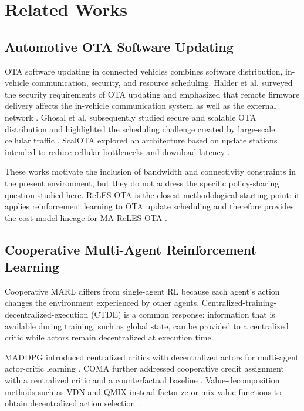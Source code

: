 \documentclass{iutbscthesis}
\begin{document}
\chapter{Related Works}

\section{Automotive OTA Software Updating}
OTA software updating in connected vehicles combines software distribution, in-vehicle communication, security, and resource scheduling. Halder et al. surveyed the security requirements of OTA updating and emphasized that remote firmware delivery affects the in-vehicle communication system as well as the external network \parencite{halder2020survey}. Ghosal et al. subsequently studied secure and scalable OTA distribution and highlighted the scheduling challenge created by large-scale cellular traffic \parencite{ghosal2022stride}. ScalOTA explored an architecture based on update stations intended to reduce cellular bottlenecks and download latency \parencite{shoker2023scalota}.

These works motivate the inclusion of bandwidth and connectivity constraints in the present environment, but they do not address the specific policy-sharing question studied here. ReLES-OTA is the closest methodological starting point: it applies reinforcement learning to OTA update scheduling and therefore provides the cost-model lineage for MA-ReLES-OTA \parencite{bhattacharjee2025relesota}.

\section{Cooperative Multi-Agent Reinforcement Learning}
Cooperative MARL differs from single-agent RL because each agent's action changes the environment experienced by other agents. Centralized-training-decentralized-execution (CTDE) is a common response: information that is available during training, such as global state, can be provided to a centralized critic while actors remain decentralized at execution time.

MADDPG introduced centralized critics with decentralized actors for multi-agent actor-critic learning \parencite{lowe2017maddpg}. COMA further addressed cooperative credit assignment with a centralized critic and a counterfactual baseline \parencite{foerster2018coma}. Value-decomposition methods such as VDN and QMIX instead factorize or mix value functions to obtain decentralized action selection \parencite{sunehag2018vdn,rashid2018qmix}.
\end{document}
